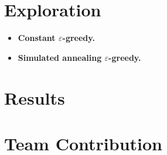 \documentclass{article}
\begin{document}
\section{Exploration}

\begin{itemize}
    \item {\bf Constant $\varepsilon$-greedy.}
    \item {\bf Simulated annealing $\varepsilon$-greedy.}
\end{itemize}

\section{Results}


\section{Team Contribution}



\end{document}
